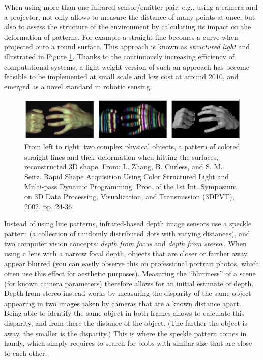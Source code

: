 When using more than one infrared sensor/emitter pair, e.g., using a camera and a projector, not only allows to measure the distance of many points at once, but also to assess the structure of the environment by calculating its impact on the deformation of patterns. For example a straight line becomes a curve when projected onto a round surface. This approach is known as \emph{structured light} and illustrated in Figure \ref{fig:struclight}. Thanks to the continuously increasing efficiency of computational systems, a light-weight version of such an approach has become feasible to be implemented at small scale and low cost at around 2010, and emerged as a novel standard in robotic sensing.

\begin{figure}
	\centering
		\includegraphics[width=\textwidth]{figs/structuredlight.png}
	\caption{From left to right: two complex physical objects, a pattern of colored straight lines and their deformation when hitting the surfaces, reconstructed 3D shape. From: L. Zhang, B. Curless, and S. M. Seitz. Rapid Shape Acquisition Using Color Structured Light and Multi-pass Dynamic Programming. Proc. of the 1st Int. Symposium on 3D Data Processing, Visualization, and Transmission (3DPVT), 2002, pp. 24-36.}
	\label{fig:struclight}
\end{figure}

Instead of using line patterns, infrared-based depth image sensors use a speckle pattern (a collection of randomly distributed dots with varying distances), and two computer vision concepts: \emph{depth from focus} and \emph{depth from stereo}.. When using a lens with a narrow focal depth, objects that are closer or farther away appear blurred (you can easily observe this on professional portrait photos, which often use this effect for aesthetic purposes). Measuring the ``bluriness'' of a scene (for known camera parameters) therefore allows for an initial estimate of depth. Depth from stereo instead works by measuring the disparity of the same object appearing in two images taken by cameras that are a known distance apart. Being able to identify the same object in both frames allows to calculate this disparity, and from there the distance of the object. (The farther the object is away, the smaller is the disparity.) This is where the speckle pattern comes in handy, which simply requires to search for blobs with similar size that are close to each other.


